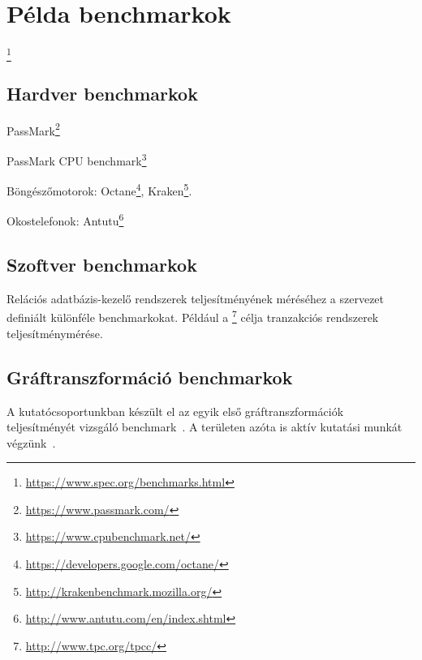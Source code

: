 \section{Példa benchmarkok\kieg}

\footnote{\url{https://www.spec.org/benchmarks.html}}

\subsection{Hardver benchmarkok}

PassMark\footnote{\url{https://www.passmark.com/}}

PassMark CPU benchmark\footnote{\url{https://www.cpubenchmark.net/}}

Böngészőmotorok: Octane\footnote{\url{https://developers.google.com/octane/}},
Kraken\footnote{\url{http://krakenbenchmark.mozilla.org/}}.

Okostelefonok: Antutu\footnote{\url{http://www.antutu.com/en/index.shtml}}


\subsection{Szoftver benchmarkok}

Relációs adatbázis-kezelő rendszerek teljesítményének méréséhez a  szervezet definiált különféle benchmarkokat. Például a \footnote{\url{http://www.tpc.org/tpcc/}} célja tranzakciós  rendszerek teljesítménymérése.

\subsection{Gráftranszformáció benchmarkok}

A kutatócsoportunkban készült el az egyik első gráftranszformációk teljesítményét vizsgáló benchmark~\cite{vlhcc05_vsv}. A területen azóta is aktív kutatási munkát végzünk~\cite{DBLP:conf/staf/SzarnyasSRV15}.

